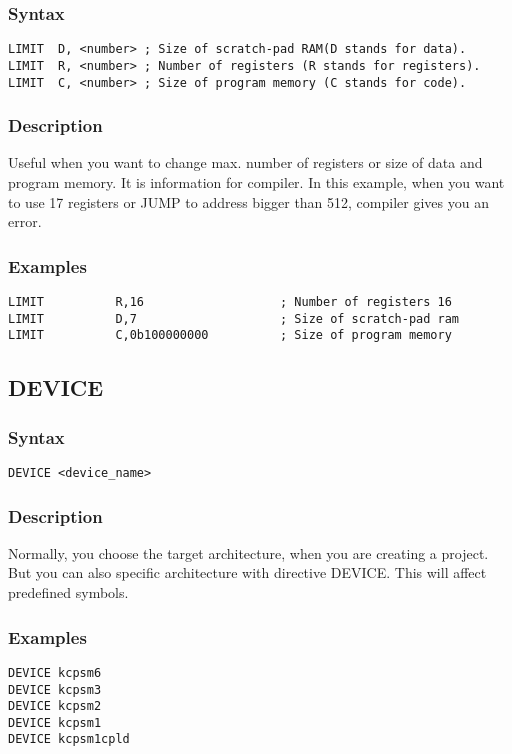         \subsubsection{Syntax}
            \verb'LIMIT  D, <number> ; Size of scratch-pad RAM(D stands for data).'\\
            \verb'LIMIT  R, <number> ; Number of registers (R stands for registers).'\\
            \verb'LIMIT  C, <number> ; Size of program memory (C stands for code).'\\

        \subsubsection{Description}
            Useful when you want to change max. number of registers or size of  data and program memory. It is information for compiler. In this example, when you want to use 17 registers or JUMP to address bigger than 512, compiler gives you an error.

        \subsubsection{Examples}
            \verb'LIMIT          R,16                   ; Number of registers 16'\\
            \verb'LIMIT          D,7                    ; Size of scratch-pad ram   '\\
            \verb'LIMIT          C,0b100000000          ; Size of program memory '\\

    \subsection{DEVICE}
        \subsubsection{Syntax}
            \verb'DEVICE <device_name>'

        \subsubsection{Description}
            Normally, you choose the target architecture, when you are creating a project. But you can also specific architecture with directive DEVICE. This will affect predefined symbols.

        \subsubsection{Examples}
            \verb'DEVICE kcpsm6'\\
            \verb'DEVICE kcpsm3'\\
            \verb'DEVICE kcpsm2'\\
            \verb'DEVICE kcpsm1'\\
            \verb'DEVICE kcpsm1cpld'

